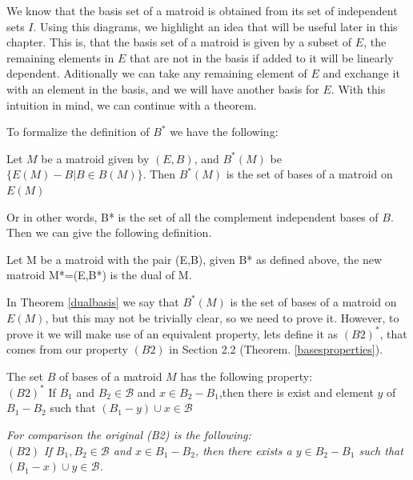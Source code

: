 We know that the basis set of a matroid is obtained from its set of independent sets $I$.
Using this diagrams, we highlight an idea that will be useful later in this chapter.
This is, that the basis set of a matroid is given by a subset of $E$, the remaining elements in $E$ that are not in the basis if added to it will be linearly dependent. Aditionally we can take any remaining element of $E$ and exchange it with an element in the basis, and we will have another basis for $E$. With this intuition in mind, we can continue with a theorem.


To formalize the definition of $B^*$ we have the following:
\begin{theorem}\label{dualbasis}
    Let $M$ be a matroid given by $(E,B)$, and $B^*(M)$ be $\{E(M) - B|B\in B(M)\}$. Then $B^*(M)$ is the set of bases of a matroid on $E(M)$
\end{theorem}

Or in other words, B* is the set of all the complement independent bases of $B$. Then we can give the following definition.

\begin{defn}
    Let M be a matroid with the pair (E,B), given B* as defined above, the new matroid M*=(E,B*) is the dual of M.
\end{defn}

In Theorem \ref{dualbasis} we say that $B^*(M)$ is the set of bases of a matroid on $E(M)$, but this may not be trivially clear, so we need to prove it. However, to prove it we will make use of an equivalent property, lets define it as $(B2)^*$, that comes from our property $(B2)$ in Section 2.2 (Theorem. \ref{basesproperties}).

\begin{lemma}\label{B2Dual}
    The set $B$ of bases of a matroid $M$ has the following property:\\
    $(B2)^*$ If $B_1$ and $B_2 \in \mathcal{B}$ and $x \in B_2 - B_1$,then there is exist and element $y$ of $B_1 - B_2$ such that $(B_1 - y) \cup x \in \mathcal{B}$
\end{lemma}

\textit{For comparison the original (B2) is the following: \\
$(B2)$ If $B_1,B_2\in \mathcal{B}$ and $x\in B_1 - B_2$, then there exists a $y\in B_2 - B_1$ such that $(B_1 - x)\cup y \in \mathcal{B}$.}\\

